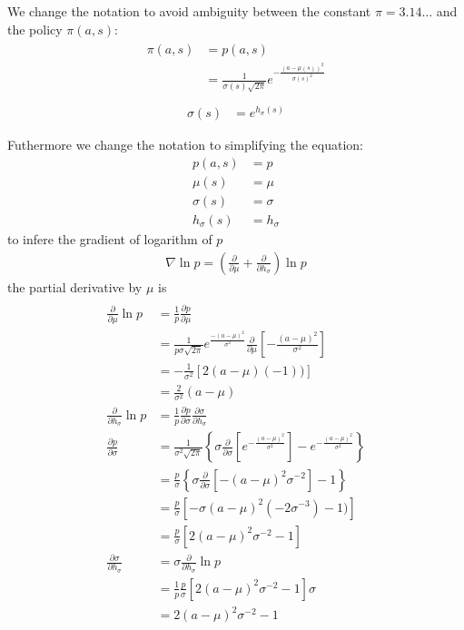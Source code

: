 \documentclass[]{article}
\begin{document}
We change the notation to avoid ambiguity between the constant $ \pi = 3.14 \dots $ and the policy $ \pi(a,s) $:
\begin{align}
\begin{split}
\pi(a, s)&	= p(a, s)
\\
&			= \frac{1}{\sigma(s) \sqrt{2 \pi}} e^{-\frac{(a-\mu(s))^2}{\sigma(s)^2}}
\\
\end{split}
\end{align}
\begin{align}
\sigma(s)&	= e^{h_\sigma(s)}	
\end{align}

Futhermore we change the notation to simplifying the equation:
\begin{align*}
p(a, s)& = p
\\
\mu(s)& = \mu
\\
\sigma(s)& = \sigma
\\
h_\sigma(s)& = h_\sigma
\end{align*}
to infere the gradient of logarithm of $ p $
\begin{align*}
\nabla \ln p = \left(
\frac{\partial}{\partial \mu} + \frac{\partial}{\partial h_\sigma}
\right)
\ln p
\end{align*}
the partial derivative by $\mu$ is 
\begin{align*}
\\
\frac{\partial}{\partial \mu} \ln p& = \frac{1}{p} \frac{\partial p}{\partial \mu}
\\
& = \frac{1}{p \sigma \sqrt{2 \pi} } e^{\frac{-(a-\mu)^2}{\sigma^2}} \frac{\partial}{\partial \mu} \left[ -\frac{(a-\mu)^2}{\sigma^2} \right]
\\
& = - \frac{1}{\sigma^2}[2 (a - \mu) (-1))]
\\
& = \frac{2}{\sigma^2}(a - \mu)
\\
\frac{\partial}{\partial h_\sigma} \ln p& = \frac{1}{p} \frac{\partial p}{\partial \sigma} \frac{\partial \sigma}{\partial h_\sigma}
\\
\frac{\partial p}{\partial \sigma}& = \frac{1}{\sigma^2 \sqrt{2 \pi}}
\left\{
\sigma \frac{\partial}{\partial \sigma}
\left[
e^{-\frac{(a-\mu)^2}{\sigma^2}}
\right]
- e^{-\frac{(a-\mu)^2}{\sigma^2}}
\right\}
\\
& = \frac{p}{\sigma}
\left\{
\sigma \frac{\partial}{\partial \sigma}
\left[
-(a - \mu)^2\sigma^{-2}
\right] - 1
\right\}
\\
& = \frac{p}{\sigma}
\left[
-\sigma (a - \mu)^2 (-2 \sigma^{-3}) - 1)
\right]
\\
& = \frac{p}{\sigma}
\left[
2(a-\mu)^2 \sigma^{-2} - 1
\right]
\\
\frac{\partial \sigma}{\partial h_\sigma}& = \sigma
\frac{\partial}{\partial h_\sigma} \ln p
\\
& = \frac{1}{p}
\frac{p}{\sigma}
\left[
2(a-\mu)^2 \sigma^{-2} - 1
\right] \sigma
\\
& = 2(a-\mu)^2 \sigma^{-2} - 1
\end{align*}
\end{document}

